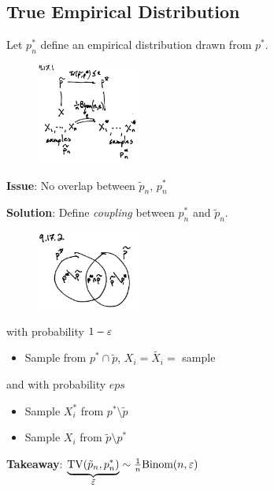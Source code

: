 \subsection{True Empirical Distribution}

Let $p_n^*$ define an empirical distribution drawn from $p^*$.

\begin{figure}[H]
\begin{center}
  \includegraphics[width=0.3\textwidth]{figures/9-17-1.png}
\end{center}
\end{figure}


\textbf{Issue}: No overlap between $\tilde{p}_n$, $p_n^*$

\textbf{Solution}: Define \emph{coupling} between $p_n^*$ and $\tilde{p}_n$.

\begin{figure}[H]
\begin{center}
  \includegraphics[width=0.3\textwidth]{figures/9-17-2.png}
\end{center}
\end{figure}

with probability $1 - \varepsilon$
\begin{itemize}
  \item Sample from $p^* \cap \tilde{p}$, $X_i = \tilde{X_i} =$ sample
\end{itemize}
and with probability $eps$
\begin{itemize}
  \item Sample $X_i^*$ from $p^* \setminus \tilde{p}$
  \item Sample $X_i$ from $\tilde{p} \setminus p^*$
\end{itemize}

\textbf{Takeaway}:
$\underbrace{\operatorname{TV}(\tilde{p}_n, p_n^*)}_{\tilde{\varepsilon}} \sim \frac{1}{n}\text{Binom}(n, \varepsilon)$

